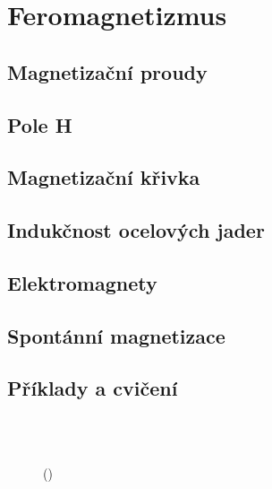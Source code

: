 \setchaptertoc
\chapter{Feromagnetizmus}\label{fyz:IIchapXXXVI}

  \section{Magnetizační proudy}\label{fyz:IIchapXXXVIsecI}
  \section{Pole H}\label{fyz:IIchapXXXVIsecII}
  \section{Magnetizační křivka}\label{fyz:IIchapXXXVIsecIII}
  \section{Indukčnost ocelových jader}\label{fyz:IIchapXXXVIsecIV}
  \section{Elektromagnety}\label{fyz:IIchapXXXVIsecV}
  \section{Spontánní magnetizace}\label{fyz:IIchapXXXVIsecVI}
  \section{Příklady a cvičení}\label{fyz:IIchapXXXVIsecVII}

    \begin{figure}[ht!] %
      \centering
                     \\
                     \\
      \caption{
               (\cite[s.~748]{Feynman02})}
      \label{fyz:fig0831}
    \end{figure}

